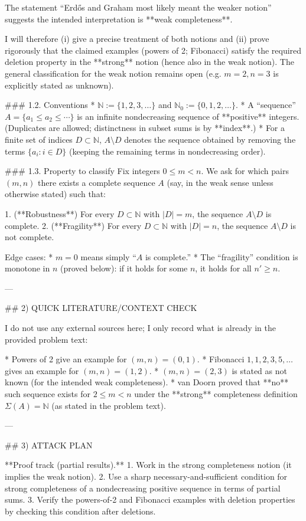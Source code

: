 The statement “Erd\H{o}s and Graham most likely meant the weaker notion” suggests the intended
interpretation is **weak completeness**.

I will therefore (i) give a precise treatment of both notions and (ii) prove rigorously that the
claimed examples (powers of 2; Fibonacci) satisfy the required deletion property in the **strong**
notion (hence also in the weak notion). The general classification for the weak notion remains open
(e.g. \(m=2,n=3\) is explicitly stated as unknown).

### 1.2. Conventions
* \(\mathbb N:=\{1,2,3,\dots\}\) and \(\mathbb N_0:=\{0,1,2,\dots\}\).
* A “sequence” \(A=\{a_1\le a_2\le\cdots\}\) is an infinite nondecreasing sequence of **positive** integers.
  (Duplicates are allowed; distinctness in subset sums is by **index**.)
* For a finite set of indices \(D\subset\mathbb N\), \(A\setminus D\) denotes the sequence obtained by
  removing the terms \(\{a_i: i\in D\}\) (keeping the remaining terms in nondecreasing order).

### 1.3. Property to classify
Fix integers \(0\le m<n\). We ask for which pairs \((m,n)\) there exists a complete sequence \(A\)
(say, in the weak sense unless otherwise stated) such that:

1. (**Robustness**) For every \(D\subset\mathbb N\) with \(|D|=m\), the sequence \(A\setminus D\) is complete.
2. (**Fragility**) For every \(D\subset\mathbb N\) with \(|D|=n\), the sequence \(A\setminus D\) is not complete.

Edge cases:
* \(m=0\) means simply “\(A\) is complete.”
* The “fragility” condition is monotone in \(n\) (proved below): if it holds for some \(n\), it holds
  for all \(n'\ge n\).

---

## 2) QUICK LITERATURE/CONTEXT CHECK

I do not use any external sources here; I only record what is already in the provided problem text:

* Powers of 2 give an example for \((m,n)=(0,1)\).
* Fibonacci \(1,1,2,3,5,\dots\) gives an example for \((m,n)=(1,2)\).
* \((m,n)=(2,3)\) is stated as not known (for the intended weak completeness).
* van Doorn proved that **no** such sequence exists for \(2\le m<n\) under the **strong** completeness
  definition \(\Sigma(A)=\mathbb N\) (as stated in the problem text).

---

## 3) ATTACK PLAN

**Proof track (partial results).**
1. Work in the strong completeness notion (it implies the weak notion).
2. Use a sharp necessary-and-sufficient condition for strong completeness of a nondecreasing
   positive sequence in terms of partial sums.
3. Verify the powers-of-2 and Fibonacci examples with deletion properties by checking this
   condition after deletions.

